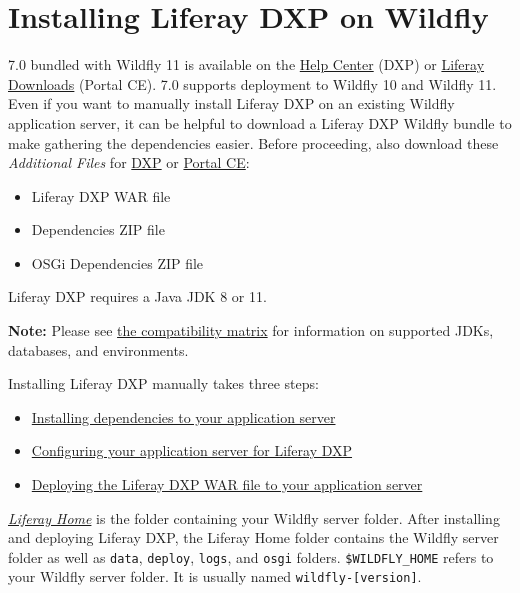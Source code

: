 \section{Installing Liferay DXP on
Wildfly}\label{installing-liferay-dxp-on-wildfly}

7.0 bundled with Wildfly 11 is available on the
\href{https://help.liferay.com/hc}{Help Center} (DXP) or
\href{https://www.liferay.com/downloads}{Liferay Downloads} (Portal CE).
7.0 supports deployment to Wildfly 10 and Wildfly 11. Even if you want
to manually install Liferay DXP on an existing Wildfly application
server, it can be helpful to download a Liferay DXP Wildfly bundle to
make gathering the dependencies easier. Before proceeding, also download
these \emph{Additional Files} for
\href{https://help.liferay.com/hc}{DXP} or
\href{https://www.liferay.com/downloads-community}{Portal CE}:

\begin{itemize}
\tightlist
\item
  Liferay DXP WAR file
\item
  Dependencies ZIP file
\item
  OSGi Dependencies ZIP file
\end{itemize}

Liferay DXP requires a Java JDK 8 or 11.

\noindent\hrulefill

\textbf{Note:} Please see
\href{https://www.liferay.com/documents/10182/246659966/Liferay+DXP+7.1+Compatibility+Matrix.pdf/c8805b72-c693-1f26-3f2d-731ffc301366}{the
compatibility matrix} for information on supported JDKs, databases, and
environments.

\noindent\hrulefill

Installing Liferay DXP manually takes three steps:

\begin{itemize}
\tightlist
\item
  \hyperref[installing-dependencies]{Installing dependencies to your
  application server}
\item
  \hyperref[configuring-wildfly]{Configuring your application server for
  Liferay DXP}
\item
  \hyperref[deploying-product]{Deploying the Liferay DXP WAR file to
  your application server}
\end{itemize}

\href{/docs/7-1/deploy/-/knowledge_base/d/installing-liferay\#liferay-home}{\emph{Liferay
Home}} is the folder containing your Wildfly server folder. After
installing and deploying Liferay DXP, the Liferay Home folder contains
the Wildfly server folder as well as \texttt{data}, \texttt{deploy},
\texttt{logs}, and \texttt{osgi} folders. \texttt{\$WILDFLY\_HOME}
refers to your Wildfly server folder. It is usually named
\texttt{wildfly-{[}version{]}}.

